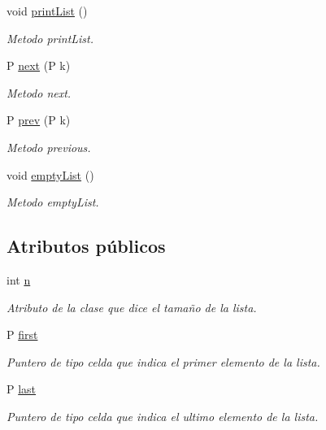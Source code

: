 \begin{DoxyCompactItemize}
void \hyperlink{class_list_with_pointer_a7079b5f1dbddb87a7e33ffc71ebb7b92}{print\-List} ()
\begin{DoxyCompactList}\small\item\em Metodo print\-List. \end{DoxyCompactList}\item 
P \hyperlink{class_list_with_pointer_a518b5ee89e3ad32ae7cd4ddd5d4fa7e9}{next} (P k)
\begin{DoxyCompactList}\small\item\em Metodo next. \end{DoxyCompactList}\item 
P \hyperlink{class_list_with_pointer_a7242068fcc3a193f0f7e94517856e431}{prev} (P k)
\begin{DoxyCompactList}\small\item\em Metodo previous. \end{DoxyCompactList}\item 
void \hyperlink{class_list_with_pointer_aec4f5374971962c79d397bbcd0080199}{empty\-List} ()
\begin{DoxyCompactList}\small\item\em Metodo empty\-List. \end{DoxyCompactList}\end{DoxyCompactItemize}
\subsection*{Atributos públicos}
\begin{DoxyCompactItemize}
\item 
\hypertarget{class_list_with_pointer_aac685c03cf811f155e2e0393a833ae33}{int \hyperlink{class_list_with_pointer_aac685c03cf811f155e2e0393a833ae33}{n}}\label{class_list_with_pointer_aac685c03cf811f155e2e0393a833ae33}

\begin{DoxyCompactList}\small\item\em Atributo de la clase que dice el tamaño de la lista. \end{DoxyCompactList}\item 
\hypertarget{class_list_with_pointer_a10f9bcf73fcff6ca7fae28bec209bd20}{P \hyperlink{class_list_with_pointer_a10f9bcf73fcff6ca7fae28bec209bd20}{first}}\label{class_list_with_pointer_a10f9bcf73fcff6ca7fae28bec209bd20}

\begin{DoxyCompactList}\small\item\em Puntero de tipo celda que indica el primer elemento de la lista. \end{DoxyCompactList}\item 
\hypertarget{class_list_with_pointer_aa4ff3f43dffeb524dc1cf3ac5dfdb415}{P \hyperlink{class_list_with_pointer_aa4ff3f43dffeb524dc1cf3ac5dfdb415}{last}}\label{class_list_with_pointer_aa4ff3f43dffeb524dc1cf3ac5dfdb415}

\begin{DoxyCompactList}\small\item\em Puntero de tipo celda que indica el ultimo elemento de la lista. \end{DoxyCompactList}\end{DoxyCompactItemize}


